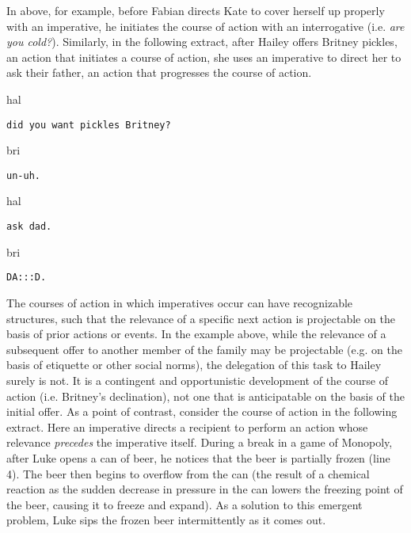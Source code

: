 \documentclass[output=paper,nonflat,modfont,draft]{langsci/langscibook}
\begin{document}
In  above, for example, before Fabian directs Kate to cover herself up properly with an imperative, he initiates the course of action with an interrogative (i.e. \textit{are you cold?}). Similarly, in the following extract, after Hailey offers Britney pickles, an action that initiates a course of action, she uses an imperative to direct her to ask their father, an action that progresses the course of action.


\begin{transbox}{1}{hal}
\begin{verbatim}
did you want pickles Britney?
\end{verbatim}
\end{transbox}

\begin{transbox}{2}{bri}
\begin{verbatim}
un-uh.
\end{verbatim}
\end{transbox}

\begin{transbox}{3}{hal}
\begin{verbatim}
ask dad.
\end{verbatim}
\end{transbox}


\begin{transbox}{5}{bri}
\begin{verbatim}
DA:::D.
\end{verbatim}
\end{transbox}\bigskip

The courses of action in which imperatives occur can have recognizable structures, such that the relevance of a specific next action is projectable on the basis of prior actions or events. In the example above, while the relevance of a subsequent offer to another member of the family may be projectable (e.g. on the basis of etiquette or other social norms), the delegation of this task to Hailey surely is not. It is a contingent and opportunistic development of the course of action (i.e. Britney’s declination), not one that is anticipatable on the basis of the initial offer. As a point of contrast, consider the course of action in the following extract. Here an imperative directs a recipient to perform an action whose relevance \textit{precedes} the imperative itself. During a break in a game of Monopoly, after Luke opens a can of beer, he notices that the beer is partially frozen (line 4). The beer then begins to overflow from the can (the result of a chemical reaction as the sudden decrease in pressure in the can lowers the freezing point of the beer, causing it to freeze and expand). As a solution to this emergent problem, Luke sips the frozen beer intermittently as it comes out.
\end{document}
